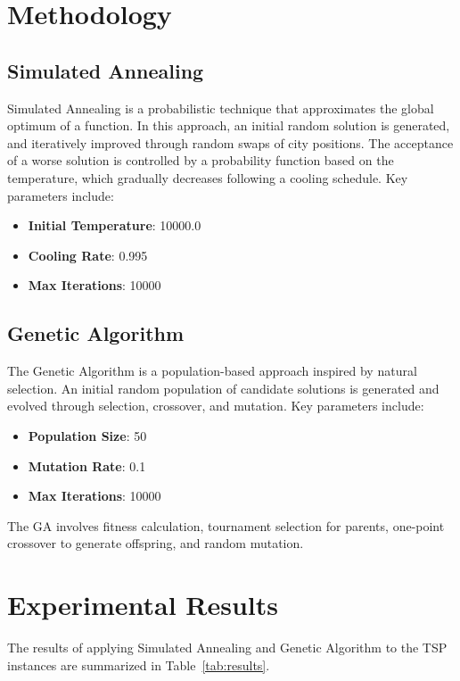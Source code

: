 \documentclass{article}
\begin{document}
\section{Methodology}
\subsection{Simulated Annealing}
Simulated Annealing is a probabilistic technique that approximates the global optimum of a function. In this approach, an initial random solution is generated, and iteratively improved through random swaps of city positions. The acceptance of a worse solution is controlled by a probability function based on the temperature, which gradually decreases following a cooling schedule. Key parameters include:
\begin{itemize}
    \item \textbf{Initial Temperature}: 10000.0
    \item \textbf{Cooling Rate}: 0.995
    \item \textbf{Max Iterations}: 10000
\end{itemize}

\subsection{Genetic Algorithm}
The Genetic Algorithm is a population-based approach inspired by natural selection. An initial random population of candidate solutions is generated and evolved through selection, crossover, and mutation. Key parameters include:
\begin{itemize}
    \item \textbf{Population Size}: 50
    \item \textbf{Mutation Rate}: 0.1
    \item \textbf{Max Iterations}: 10000
\end{itemize}
The GA involves fitness calculation, tournament selection for parents, one-point crossover to generate offspring, and random mutation.

\section{Experimental Results}
The results of applying Simulated Annealing and Genetic Algorithm to the TSP instances are summarized in Table~\ref{tab:results}.
\end{document}
